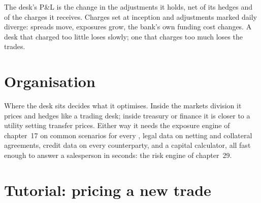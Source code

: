 \begin{omfigure}

\label{fig:rc:the-valuation-adjustment-desk:ee}
\end{omfigure}

The desk's P\&L is the change in the adjustments it holds, net of its hedges and of the
charges it receives. Charges set at inception and adjustments marked daily diverge: spreads
move, exposures grow, the bank's own funding cost changes. A desk that charged too little
loses slowly; one that charges too much loses the trades.

\section{Organisation}

Where the desk sits decides what it optimises. Inside the markets division it prices and
hedges like a trading desk; inside treasury or finance it is closer to a utility setting
transfer prices. Either way it needs the exposure engine of chapter~17 on common scenarios
for every , legal data on netting and collateral agreements, credit data on every
counterparty, and a capital calculator, all fast enough to answer a salesperson in seconds:
the risk engine of chapter~29.

\section{Tutorial: pricing a new trade}\label{tut:rc:the-valuation-adjustment-desk:tutorial}


